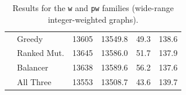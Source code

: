 \documentclass[12pt]{article}
\begin{document}
\begin{table}[H]
\begin{tabular}{|l|l|r|r|r|r|}
                     & \cellcolor{clrGreedy!25}Greedy      & \cellcolor{clrGreedy!25}13605   & \cellcolor{clrGreedy!25}13549.8  & \cellcolor{clrGreedy!25}49.3   & \cellcolor{clrGreedy!25}138.6  \\
                     & \cellcolor{clrRanked!25}Ranked Mut. & \cellcolor{clrRanked!25}13645   & \cellcolor{clrRanked!25}13586.0  & \cellcolor{clrRanked!25}51.7   & \cellcolor{clrRanked!25}137.9  \\
                     & \cellcolor{clrBalancer!25}Balancer  & \cellcolor{clrBalancer!25}13638 & \cellcolor{clrBalancer!25}13589.6 & \cellcolor{clrBalancer!25}56.2 & \cellcolor{clrBalancer!25}137.6 \\
                     & \cellcolor{clrAll!25}All Three      & \cellcolor{clrAll!25}13553      & \cellcolor{clrAll!25}13508.7     & \cellcolor{clrAll!25}43.6      & \cellcolor{clrAll!25}139.7     \\
\bottomrule
\end{tabular}
\caption{Results for the \texttt{w} and \texttt{pw} families
         (wide-range integer-weighted graphs).}
\label{tab:results-w}
\end{table}
\end{document}
